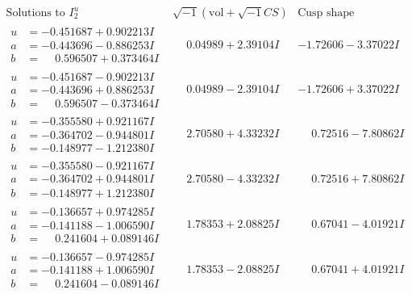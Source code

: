 \documentclass[1p]{elsarticle_modified}
\theoremstyle{definition}
\newcommand{\I}{\sqrt{-1}}
\begin{document}
$$\begin{array}{c|c|c}  
\text{Solutions to }I^u_{2}& \I (\text{vol} + \sqrt{-1}CS) & \text{Cusp shape}\\
 \hline 
\begin{aligned}
u &= -0.451687 + 0.902213 I \\
a &= -0.443696 - 0.886253 I \\
b &= \phantom{-}0.596507 + 0.373464 I\end{aligned}
 & \phantom{-}0.04989 + 2.39104 I & -1.72606 - 3.37022 I \\ \hline\begin{aligned}
u &= -0.451687 - 0.902213 I \\
a &= -0.443696 + 0.886253 I \\
b &= \phantom{-}0.596507 - 0.373464 I\end{aligned}
 & \phantom{-}0.04989 - 2.39104 I & -1.72606 + 3.37022 I \\ \hline\begin{aligned}
u &= -0.355580 + 0.921167 I \\
a &= -0.364702 - 0.944801 I \\
b &= -0.148977 - 1.212380 I\end{aligned}
 & \phantom{-}2.70580 + 4.33232 I & \phantom{-}0.72516 - 7.80862 I \\ \hline\begin{aligned}
u &= -0.355580 - 0.921167 I \\
a &= -0.364702 + 0.944801 I \\
b &= -0.148977 + 1.212380 I\end{aligned}
 & \phantom{-}2.70580 - 4.33232 I & \phantom{-}0.72516 + 7.80862 I \\ \hline\begin{aligned}
u &= -0.136657 + 0.974285 I \\
a &= -0.141188 - 1.006590 I \\
b &= \phantom{-}0.241604 + 0.089146 I\end{aligned}
 & \phantom{-}1.78353 + 2.08825 I & \phantom{-}0.67041 - 4.01921 I \\ \hline\begin{aligned}
u &= -0.136657 - 0.974285 I \\
a &= -0.141188 + 1.006590 I \\
b &= \phantom{-}0.241604 - 0.089146 I\end{aligned}
 & \phantom{-}1.78353 - 2.08825 I & \phantom{-}0.67041 + 4.01921 I \\ \hline\begin{aligned}

\end{aligned}
\end{array}$$
\end{document}

